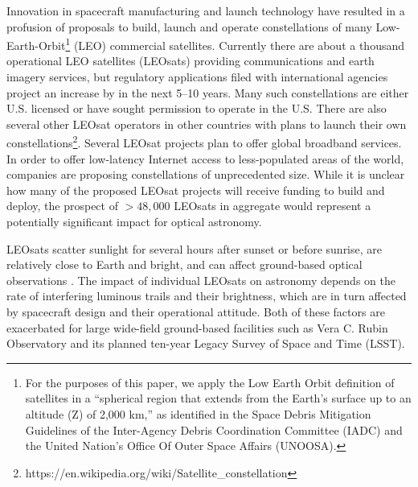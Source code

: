 \documentclass[twocolumn,trackchanges]{aastex63}
\begin{document}
Innovation in spacecraft manufacturing and launch technology have resulted in a profusion of proposals to build, launch and operate constellations of many Low-Earth-Orbit\footnote{For the purposes of this paper, we apply the Low Earth Orbit definition of satellites in a “spherical region that extends from the Earth’s surface up to an altitude (Z) of 2,000 km,” as identified in the Space Debris Mitigation Guidelines of the Inter-Agency Debris Coordination Committee (IADC) and the United Nation’s Office Of Outer Space Affairs (UNOOSA).} (LEO) commercial satellites.  Currently there are about a thousand operational LEO satellites (LEOsats) providing communications and earth imagery services, but regulatory applications filed with international agencies project an increase by  in the next 5--10 years.  Many such constellations are either U.S. licensed or have sought permission to operate in the U.S. There are also several other LEOsat operators in other countries with plans to launch their own constellations\footnote{https://en.wikipedia.org/wiki/Satellite\_constellation}. Several LEOsat projects plan to offer global broadband services. In order to offer low-latency Internet access to less-populated areas of the world, companies are proposing constellations of unprecedented size. While it is unclear how many of the proposed LEOsat projects will receive funding to build and deploy, the prospect of $>48,000$ LEOsats in aggregate would represent a potentially significant impact for optical astronomy.


LEOsats scatter sunlight for several hours after sunset or before sunrise, are relatively close to Earth and bright, and can affect ground-based optical observations
\citep{2020AAS...23541003S, 2020ApJ...892L..36M, 2020A&A...636A.121H}. The impact of individual LEOsats on astronomy depends on the rate of interfering luminous trails and their brightness, which are in turn affected by spacecraft design and their operational attitude.
Both of these factors are exacerbated for large wide-field ground-based facilities such as Vera C. Rubin Observatory and its planned ten-year Legacy Survey of Space and Time (LSST).
\end{document}
